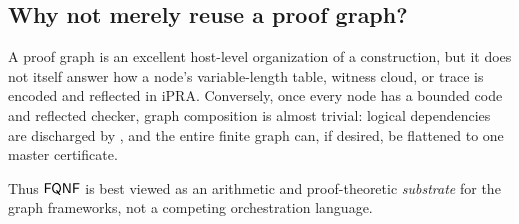\subsection{Why not merely reuse a proof graph?}

A proof graph is an excellent host-level organization of a construction, but
it does not itself answer how a node's variable-length table, witness cloud, or
trace is encoded and reflected in iPRA.  Conversely, once every node has a
bounded code and reflected checker, graph composition is almost trivial:
logical dependencies are discharged by , and the entire
finite graph can, if desired, be flattened to one master certificate.

Thus \(\mathsf{FQNF}\) is best viewed as an arithmetic and proof-theoretic
\emph{substrate} for the graph frameworks, not a competing orchestration
language.

